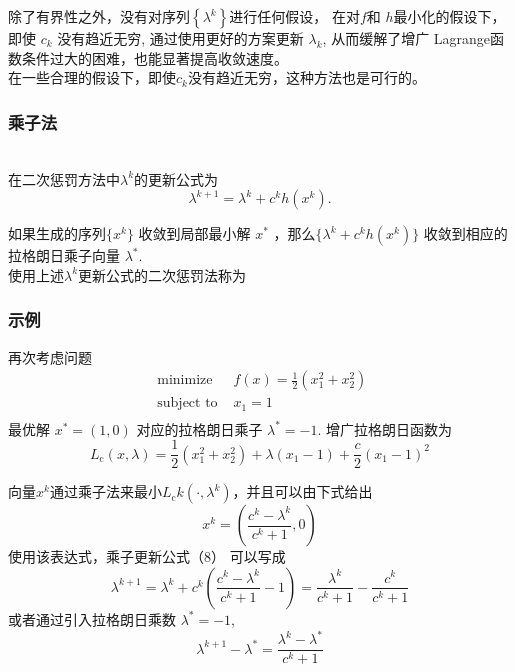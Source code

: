 \documentclass[handout,10pt]{beamer} %
\begin{document}
\begin{frame}
\qquad 除了有界性之外，没有对序列$\left\{\lambda^k\right\}$进行任何假设， 在对$f$和 $h$最小化的假设下，即使 $c_k$ 没有趋近无穷, 通过使用更好的方案更新 $\lambda_k$, 从而缓解了增广 Lagrange函数条件过大的困难，也能显著提高收敛速度。\\
\qquad 在一些合理的假设下，即使$c_k$没有趋近无穷，这种方法也是可行的。
\end{frame}

\begin{frame}
\frametitle{乘子法}
\\
\bigskip
在二次惩罚方法中$\lambda^{k}$的更新公式为
\begin{equation}
\lambda^{k+1}=\lambda^{k}+c^{k} h\left(x^{k}\right) .
\end{equation}
\end{frame}

\begin{frame}
\qquad 如果生成的序列$\{x^k\}$ 收敛到局部最小解 $x^*$ ，那么$\{\lambda^k + c^kh(x^k)\}$ 收敛到相应的拉格朗日乘子向量 $\lambda^*$.\\
\qquad 使用上述$\lambda^{k}$更新公式的二次惩罚法称为
\end{frame}

\begin{frame}
\frametitle{示例}

再次考虑问题
\begin{equation}
		\begin{array}{ll}
		\text{ minimize } &f(x)=\frac{1}{2}\left(x_{1}^{2}+x_{2}^{2}\right) \\
		\text { subject to } &x_{1}=1\\
		
		\end{array}
	\end{equation}
最优解 $x^{*}=(1,0)$ 对应的拉格朗日乘子 $\lambda^{*}=-1 .$ 增广拉格朗日函数为
$$
L_{\mathrm{c}}(x, \lambda)=\frac{1}{2}\left(x_{1}^{2}+x_{2}^{2}\right)+\lambda\left(x_{1}-1\right)+\frac{c}{2}\left(x_{1}-1\right)^{2}
$$
\end{frame}

\begin{frame}
向量$x^{k}$通过乘子法来最小$L_{\mathrm{c}} k\left(\cdot, \lambda^{k}\right)$，并且可以由下式给出
$$
x^{k}=\left(\frac{c^{k}-\lambda^{k}}{c^{k}+1}, 0\right)
$$
使用该表达式，乘子更新公式（8） 可以写成
$$
\lambda^{k+1}=\lambda^{k}+c^{k}\left(\frac{c^{k}-\lambda^{k}}{c^{k}+1}-1\right)=\frac{\lambda^{k}}{c^{k}+1}-\frac{c^{k}}{c^{k}+1}
$$
或者通过引入拉格朗日乘数 $\lambda^{*}=-1$,
$$
\lambda^{k+1}-\lambda^{*}=\frac{\lambda^{k}-\lambda^{*}}{c^{k}+1}
$$
\end{frame}
\end{document}
